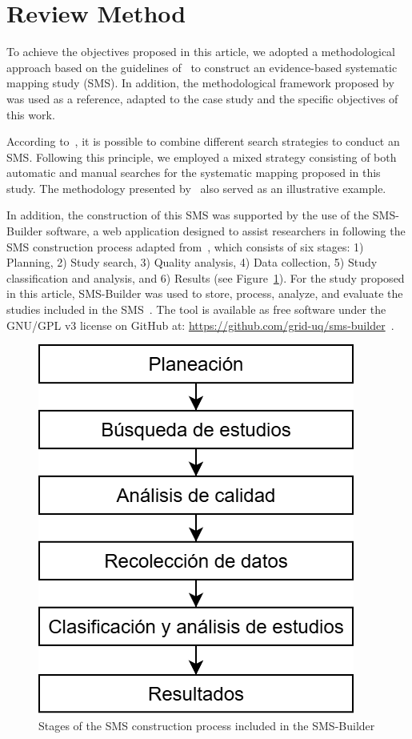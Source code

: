 \section{Review Method}\label{sec:metodo-revision}

To achieve the objectives proposed in this article, we adopted a methodological approach based on the guidelines of~\cite{Kitchenham2010792, budgen2008using} to construct an evidence-based systematic mapping study (SMS). In addition, the methodological framework proposed by~\cite{Sepúlveda202141} was used as a reference, adapted to the case study and the specific objectives of this work.

According to~\cite{Erica2017HybridSS, Nguyen201562}, it is possible to combine different search strategies to conduct an SMS. Following this principle, we employed a mixed strategy consisting of both automatic and manual searches for the systematic mapping proposed in this study. The methodology presented by~\cite{Ali201988196} also served as an illustrative example.

In addition, the construction of this SMS was supported by the use of the SMS-Builder software, a web application designed to assist researchers in following the SMS construction process adapted from~\cite{Kitchenham2010792}, which consists of six stages: 1) Planning, 2) Study search, 3) Quality analysis, 4) Data collection, 5) Study classification and analysis, and 6) Results (see Figure~\ref{figure:Stages}). For the study proposed in this article, SMS-Builder was used to store, process, analyze, and evaluate the studies included in the SMS~\cite{Candela2022100935}. The tool is available as free software under the GNU/GPL v3 license on GitHub at: \url{https://github.com/grid-uq/sms-builder}~\cite{Candela2022100935}.

\begin{figure}[htbp]
	\centering
	\includegraphics[width=0.6\linewidth]{resources/figures/sms-Etapas.drawio.png}
	\caption{Stages of the SMS construction process included in the SMS-Builder}
	\label{figure:Stages}
\end{figure}

